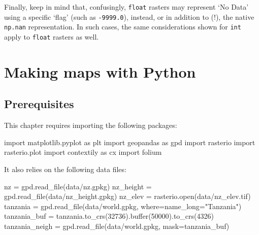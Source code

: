 \documentclass[
  letterpaper,
]{krantz}
\newenvironment{Shaded}{\begin{snugshade}}{\end{snugshade}}
\newcommand{\BuiltInTok}[1]{\textcolor[rgb]{0.00,0.23,0.31}{#1}}
\newcommand{\DecValTok}[1]{\textcolor[rgb]{0.68,0.00,0.00}{#1}}
\newcommand{\ImportTok}[1]{\textcolor[rgb]{0.00,0.46,0.62}{#1}}
\newcommand{\NormalTok}[1]{\textcolor[rgb]{0.00,0.23,0.31}{#1}}
\newcommand{\OperatorTok}[1]{\textcolor[rgb]{0.37,0.37,0.37}{#1}}
\newcommand{\StringTok}[1]{\textcolor[rgb]{0.13,0.47,0.30}{#1}}
\begin{document}
Finally, keep in mind that, confusingly, \texttt{float} rasters may
represent `No Data' using a specific `flag' (such as \texttt{-9999.0}),
instead, or in addition to (!), the native \texttt{np.nan}
representation. In such cases, the same considerations shown for
\texttt{int} apply to \texttt{float} rasters as well.


\chapter{Making maps with Python}\label{sec-map-making}

\section*{Prerequisites}\label{prerequisites-7}


This chapter requires importing the following packages:

\begin{Shaded}
\begin{Highlighting}[]
\ImportTok{import}\NormalTok{ matplotlib.pyplot }\ImportTok{as}\NormalTok{ plt}
\ImportTok{import}\NormalTok{ geopandas }\ImportTok{as}\NormalTok{ gpd}
\ImportTok{import}\NormalTok{ rasterio}
\ImportTok{import}\NormalTok{ rasterio.plot}
\ImportTok{import}\NormalTok{ contextily }\ImportTok{as}\NormalTok{ cx}
\ImportTok{import}\NormalTok{ folium}
\end{Highlighting}
\end{Shaded}

It also relies on the following data files:

\begin{Shaded}
\begin{Highlighting}[]
\NormalTok{nz }\OperatorTok{=}\NormalTok{ gpd.read\_file(}\StringTok{\textquotesingle{}data/nz.gpkg\textquotesingle{}}\NormalTok{)}
\NormalTok{nz\_height }\OperatorTok{=}\NormalTok{ gpd.read\_file(}\StringTok{\textquotesingle{}data/nz\_height.gpkg\textquotesingle{}}\NormalTok{)}
\NormalTok{nz\_elev }\OperatorTok{=}\NormalTok{ rasterio.}\BuiltInTok{open}\NormalTok{(}\StringTok{\textquotesingle{}data/nz\_elev.tif\textquotesingle{}}\NormalTok{)}
\NormalTok{tanzania }\OperatorTok{=}\NormalTok{ gpd.read\_file(}\StringTok{\textquotesingle{}data/world.gpkg\textquotesingle{}}\NormalTok{, where}\OperatorTok{=}\StringTok{\textquotesingle{}name\_long="Tanzania"\textquotesingle{}}\NormalTok{)}
\NormalTok{tanzania\_buf }\OperatorTok{=}\NormalTok{ tanzania.to\_crs(}\DecValTok{32736}\NormalTok{).}\BuiltInTok{buffer}\NormalTok{(}\DecValTok{50000}\NormalTok{).to\_crs(}\DecValTok{4326}\NormalTok{)}
\NormalTok{tanzania\_neigh }\OperatorTok{=}\NormalTok{ gpd.read\_file(}\StringTok{\textquotesingle{}data/world.gpkg\textquotesingle{}}\NormalTok{, mask}\OperatorTok{=}\NormalTok{tanzania\_buf)}
\end{Highlighting}
\end{Shaded}
\end{document}
